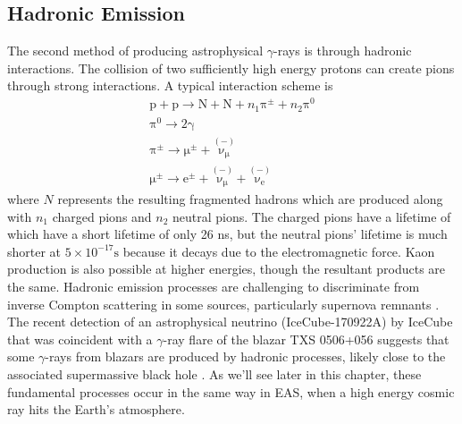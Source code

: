 \subsection{Hadronic Emission}
The second method of producing astrophysical $\gamma$-rays is through hadronic interactions. The collision of two sufficiently high energy protons can create pions through strong interactions.  A typical interaction scheme \cite{EAS} is
\begin{gather*}
\mathrm{p}+\mathrm{p}\rightarrow \mathrm{N}+\mathrm{N}+n_1 \mathrm{\pi^{\pm}}+n_2\mathrm{\pi^0} \\
\mathrm{\pi^0} \rightarrow \mathrm{2\gamma} \\
\mathrm{\mathrm{\pi^{\pm}}} \rightarrow \mathrm{\mu^{\pm}}+\mathrm{\overset{(-)}{\nu_{\mu}}}\\
\mathrm{\mu^{\pm}} \rightarrow \mathrm{e^{\pm}}+\mathrm{\overset{(-)}{\nu_{\mu}}}+\mathrm{\overset{(-)}{\nu_{e}}}
\end{gather*}
where $N$ represents the resulting fragmented hadrons which are produced along with $n_1$ charged pions and $n_2$ neutral pions. The charged pions have a lifetime of which have a short lifetime of only 26 ns, but the neutral pions' lifetime is much shorter at $5 \times 10^{-17} \mathrm{s}$ because it decays due to the electromagnetic force. Kaon production is also possible at higher energies, though the resultant products are the same. Hadronic emission processes are challenging to discriminate from inverse Compton scattering in some sources, particularly supernova remnants \cite{rxjcta}. The recent detection of an astrophysical neutrino (IceCube-170922A) by IceCube that was coincident with a $\gamma$-ray flare of the blazar TXS 0506+056 suggests that some $\gamma$-rays from blazars are produced by hadronic processes, likely close to the associated supermassive black hole \cite{TXS}. As we'll see later in this chapter, these fundamental processes occur in the same way in EAS, when a high energy cosmic ray hits the Earth's atmosphere.

